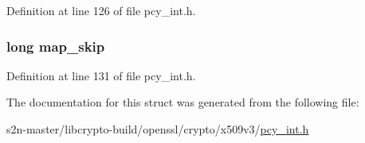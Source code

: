 Definition at line 126 of file pcy\+\_\+int.\+h.

\subsubsection[{\texorpdfstring{map\+\_\+skip}{map_skip}}]{\setlength{\rightskip}{0pt plus 5cm}long map\+\_\+skip}\hypertarget{struct_x509___p_o_l_i_c_y___c_a_c_h_e__st_a25d7050d93545c3a9992e43d309f78e2}{}\label{struct_x509___p_o_l_i_c_y___c_a_c_h_e__st_a25d7050d93545c3a9992e43d309f78e2}


Definition at line 131 of file pcy\+\_\+int.\+h.



The documentation for this struct was generated from the following file\+:\begin{DoxyCompactItemize}
\item 
s2n-\/master/libcrypto-\/build/openssl/crypto/x509v3/\hyperlink{pcy__int_8h}{pcy\+\_\+int.\+h}\end{DoxyCompactItemize}
